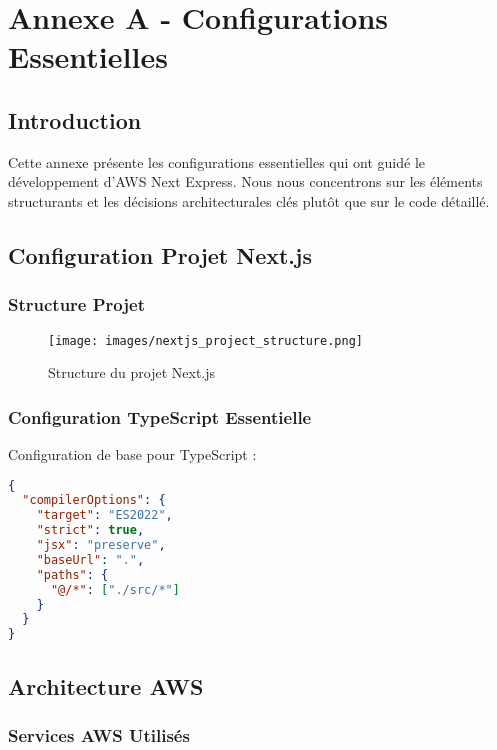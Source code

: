 \chapter{Annexe A - Configurations Essentielles}

\section{Introduction}

Cette annexe présente les configurations essentielles qui ont guidé le développement d'AWS Next Express. Nous nous concentrons sur les éléments structurants et les décisions architecturales clés plutôt que sur le code détaillé.

\section{Configuration Projet Next.js}

\subsection{Structure Projet}

\begin{figure}[H]
    \centering
    \texttt{[image: images/nextjs\_project\_structure.png]}
    \caption{Structure du projet Next.js}
    \label{fig:nextjs_structure}
\end{figure}

\subsection{Configuration TypeScript Essentielle}

Configuration de base pour TypeScript :

\begin{lstlisting}[language=json,caption=Configuration TypeScript de base]
{
  "compilerOptions": {
    "target": "ES2022",
    "strict": true,
    "jsx": "preserve",
    "baseUrl": ".",
    "paths": {
      "@/*": ["./src/*"]
    }
  }
}
\end{lstlisting}

\section{Architecture AWS}

\subsection{Services AWS Utilisés}

